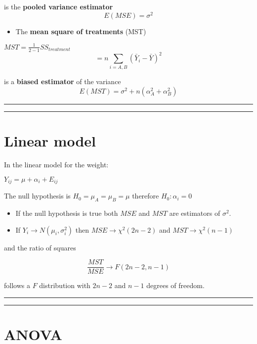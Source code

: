 \documentclass[
]{book}
\providecommand{\tightlist}{%
  \setlength{\itemsep}{0pt}\setlength{\parskip}{0pt}}
\begin{document}
is the \textbf{pooled variance estimator} \[E(MSE)=\sigma^2\]

\begin{itemize}
\tightlist
\item
  The \textbf{mean square of treatments} (MST)
\end{itemize}

\(MST=\frac{1}{2-1} SS_{treatment}\) \[ =  n\sum_{i=A,B}(\bar{Y}_{i}-\bar{Y})^2\]

is a \textbf{biased estimator} of the variance \[E(MST)=\sigma^2+n(\alpha_A^2+\alpha_B^2)\]

\begin{center}\rule{0.5\linewidth}{0.5pt}\end{center}

\begin{center}\rule{0.5\linewidth}{0.5pt}\end{center}

\hypertarget{linear-model-2}{%
\section{Linear model}\label{linear-model-2}}

In the linear model for the weight:

\(Y_{ij} = \mu + \alpha_i +E_{ij}\)

The null hypothesis is \(H_0=\mu_A=\mu_B=\mu\) therefore \(H_0:\alpha_i=0\)

\begin{itemize}
\item
  If the null hypothesis is true both \(MSE\) and \(MST\) are estimators of \(\sigma^2\).
\item
  If \(Y_i \rightarrow N(\mu_i, \sigma^2_i)\) then \(MSE \rightarrow \chi^2(2n-2)\) and \(MST \rightarrow \chi^2(n-1)\)
\end{itemize}

and the ratio of squares

\[\frac{MST}{MSE} \rightarrow F(2n-2, n-1)\]

follows a \(F\) distribution with \(2n-2\) and \(n-1\) degrees of freedom.

\begin{center}\rule{0.5\linewidth}{0.5pt}\end{center}

\begin{center}\rule{0.5\linewidth}{0.5pt}\end{center}

\hypertarget{anova}{%
\section{ANOVA}\label{anova}}
\end{document}
